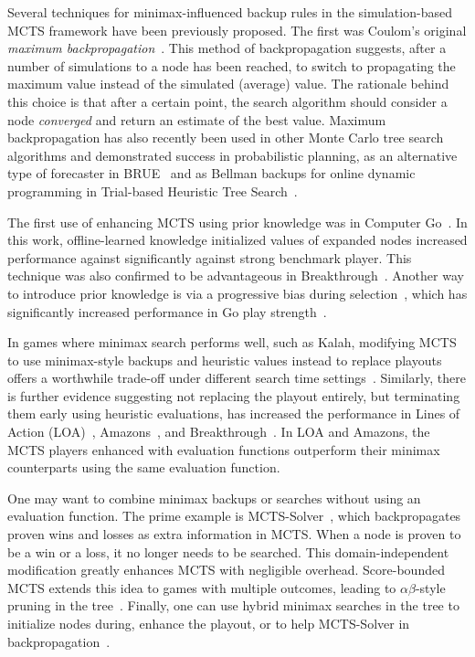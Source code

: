 \documentclass[conference]{IEEEtran}
\begin{document}
Several techniques for minimax-influenced backup rules in the simulation-based MCTS framework have been previously proposed. 
The first was Coulom's original {\it maximum backpropagation}~\cite{Coulom06Efficient}. This method of backpropagation
suggests, after a number of simulations to a node has been reached, to switch to propagating the maximum value instead 
of the simulated (average) value. 
The rationale behind this choice is that after a certain point, the search algorithm should consider a node
{\it converged} and return an estimate of the best value. 
Maximum backpropagation has also recently been used in other Monte Carlo tree search algorithms and demonstrated success in
probabilistic planning, as an alternative type of forecaster in BRUE~\cite{Feldman13Theoretically} and as Bellman 
backups for online dynamic programming in Trial-based Heuristic Tree Search~\cite{Keller13Trial}.

The first use of enhancing MCTS using prior knowledge was in Computer Go~\cite{Gelly07Combining}. 
In this work, offline-learned knowledge initialized values of expanded nodes increased performance against significantly against 
strong benchmark player. 
This technique was also confirmed to be advantageous in Breakthrough~\cite{Lorentz13Breakthrough}. 
Another way to introduce prior knowledge is via a progressive bias during selection~\cite{Chaslot08Progressive}, which has 
significantly increased performance in Go play strength~\cite{Chaslot10Adding}. 

In games where minimax search performs well, such as Kalah, 
modifying MCTS to use minimax-style backups and heuristic values instead to replace playouts offers a worthwhile trade-off 
under different search time settings~\cite{Ramanujan11Tradeoffs}.
Similarly, there is further evidence suggesting not replacing the playout entirely, but terminating them early 
using heuristic evaluations, has increased the performance in Lines of Action (LOA)~\cite{Winands10MCTS-LOA}, 
Amazons~\cite{Kloetzer10Amazons,Lorentz08Amazons}, and Breakthrough~\cite{Lorentz13Breakthrough}. In LOA and Amazons, the 
MCTS players enhanced with evaluation functions outperform their minimax counterparts using the same evaluation function.



One may want to combine minimax backups or searches without using an evaluation function. 
The prime example is MCTS-Solver~\cite{Winands08Solver}, which backpropagates proven wins and losses as 
extra information in MCTS. When a node is proven to be a 
win or a loss, it no longer needs to be searched. This domain-independent modification greatly enhances 
MCTS with negligible overhead. Score-bounded MCTS extends this idea to games with multiple 
outcomes, leading to $\alpha \beta$-style pruning in the tree~\cite{Cazenave10Score}. Finally, one can use hybrid
minimax searches in the tree to initialize nodes during, enhance the playout, or to help MCTS-Solver 
in backpropagation~\cite{Baier13MinimaxHybrids}.
\end{document}
